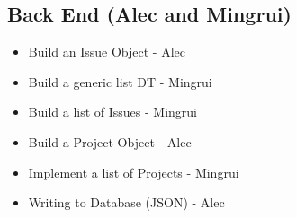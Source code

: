 \documentclass{article}
\begin{document}
    \subsection{Back End (Alec and Mingrui)}

        \begin{itemize}
            \item Build an Issue Object             - Alec
            \item Build a generic list DT           - Mingrui
            \item Build a list of Issues            - Mingrui
            \item Build a Project Object            - Alec
            \item Implement a list of Projects      - Mingrui
            \item Writing to Database (JSON)        - Alec
        \end{itemize}
\end{document}
